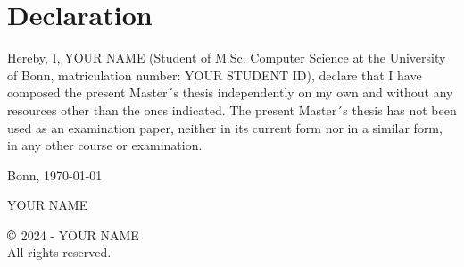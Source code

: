 \chapter*{Declaration}
\begingroup
\setlength{\parskip}{1em}

Hereby, I, YOUR NAME (Student of M.Sc. Computer Science at the University of Bonn, matriculation number: YOUR STUDENT ID), declare that I have composed the present Master´s thesis independently on my own and without any resources other than the ones indicated.
The present Master´s thesis has not been used as an examination paper, neither in its current form nor in a similar form, in any other course or examination.

\vspace{2cm}

Bonn, {\today}

\vspace{2cm}
YOUR NAME

\vspace*{\fill}

\begin{center}
    $\copyright$ 2024 - \textsc{YOUR NAME}\\
    All rights reserved.
\end{center}
\endgroup
